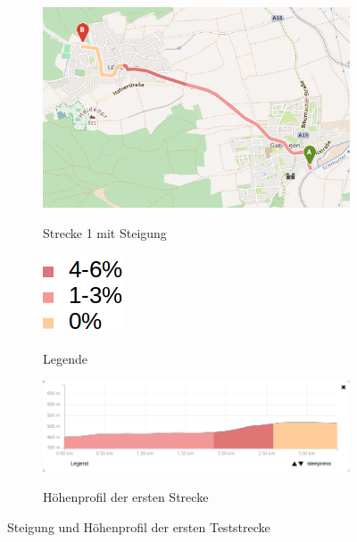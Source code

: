 \begin{figure}[h]
\centering
\begin{subfigure}{0.80\textwidth}
\centering
\includegraphics[width = \textwidth]{../media/Fahrt1_Steep.png} \\
\caption{Strecke 1 mit Steigung}
\label{fig:steig}
\end{subfigure}
\begin{subfigure}{0.18\textwidth}
\centering
\includegraphics[width =0.60 \textwidth]{../media/legend2.png} \\
\caption{Legende}
\label{fig:legend2}
\end{subfigure}
\begin{subfigure}{ \textwidth}
\centering
\includegraphics[width = \textwidth]{../media/Fahrt1_Profile.png} \\
\vspace{0.1cm}
\caption{Höhenprofil der ersten Strecke}
\label{profile}
\end{subfigure}
\caption{Steigung und Höhenprofil der ersten Teststrecke}
\label{steig}
\end{figure}

